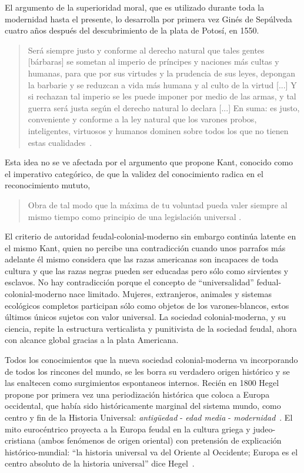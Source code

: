\documentclass[a4paper,10pt]{book}
\begin{document}
El argumento de la superioridad moral, que es utilizado durante toda la modernidad hasta el presente, lo desarrolla por primera vez Ginés de Sepúlveda cuatro años después del descubrimiento de la plata de Potosí, en 1550.
\begin{quotation}
 Será siempre justo y conforme al derecho natural que tales gentes [bárbaras] se sometan al imperio de príncipes y naciones más cultas y humanas, para que por sus virtudes y la prudencia de sus leyes, depongan la barbarie y se reduzcan a vida más humana y al culto de la virtud [...] Y si rechazan tal imperio se les puede imponer por medio de las armas, y tal guerra será justa según el derecho natural lo declara [...] En suma: es justo, conveniente y conforme a la ley natural que los varones probos, inteligentes, virtuosos y humanos dominen sobre todos los que no tienen estas cualidades~\cite{GinesdeSepulveda1967p87}.
\end{quotation}
Esta idea no se ve afectada por el argumento que propone Kant, conocido como el imperativo categórico, de que la validez del conocimiento radica en el reconocimiento mututo,
\begin{quotation}
Obra de tal modo que la máxima de tu voluntad pueda valer siempre al mismo tiempo como principio de una legislación universal \cite{Kant2003:28}.
\end{quotation}
El criterio de autoridad feudal-colonial-moderno sin embargo continúa latente en el mismo Kant, quien no percibe una contradicción cuando unos parrafos más adelante él mismo considera que las razas americanas son incapaces de toda cultura y que las razas negras pueden ser educadas pero sólo como sirvientes y esclavos.
No hay contradicción porque el concepto de ``universalidad'' fedual-colonial-moderno nace limitado.
Mujeres, extranjeros, animales y sistemas ecológicos completos participan sólo como objetos de los varones-blancos, estos últimos únicos sujetos con valor universal.
La sociedad colonial-moderna, y su ciencia, repite la estructura verticalista y punitivista de la sociedad feudal, ahora con alcance global gracias a la plata Americana.



Todos los conocimientos que la nueva sociedad colonial-moderna va incorporando de todos los rincones del mundo, se les borra su verdadero origen histórico y se las enaltecen como surgimientos espontaneos internos.
Recién en 1800 Hegel propone por primera vez una periodización histórica que coloca a Europa occidental, que había sido históricamente marginal del sistema mundo, como centro y fin de la Historia Universal: \emph{antigüedad} - \emph{edad media} - \emph{modernidad}~\cite{dussel2007}. 
El mito eurocéntrico proyecta a la Europa feudal en la cultura griega y judeo-cristiana (ambos fenómenos de origen oriental) con pretensión de explicación histórico-mundial: ``la historia universal va del Oriente al Occidente; Europa es el centro absoluto de la historia universal'' dice Hegel~\cite{hegel}.
\end{document}

